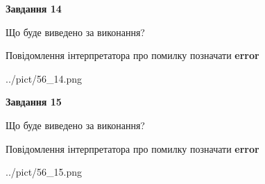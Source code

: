 \documentclass[11pt, ukrainian]{article}
\begin{document}
{\begin {large}
{\begin {center}\textbf{Завдання 14}\end {center}}\par
Що буде виведено за виконання? \par
Повідомлення інтерпретатора про помилку позначати \textbf{error}

\begin{center}
	{../pict/56_14.png}
\end{center}
\newpage

{\begin {center}\textbf{Завдання 15}\end {center}}\par
Що буде виведено за виконання? \par
Повідомлення інтерпретатора про помилку позначати \textbf{error}

\begin{center}
	{../pict/56_15.png}
\end{center}
\newpage

\end {large}}
\end{document}
